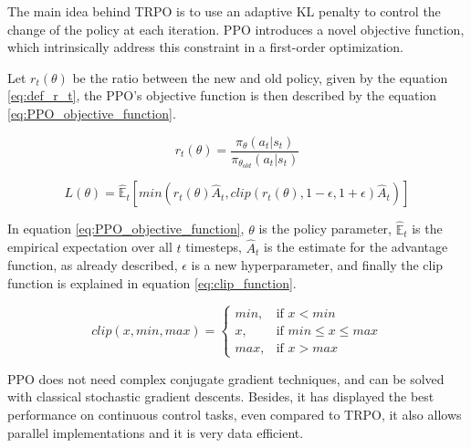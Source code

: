 The main idea behind TRPO is to use an adaptive KL penalty to control the change of the policy at each iteration. PPO introduces a novel objective function, which intrinsically address this constraint in a first-order optimization.

Let $r_t(\theta)$ be the ratio between the new and old policy, given by the equation \ref{eq:def_r_t}, the PPO's objective function is then described by the equation \ref{eq:PPO_objective_function}.

\begin{equation}
r_t(\theta) = \frac{\pi_{\theta}(a_t|s_t)}{\pi_{\theta_{old}}(a_t|s_t)}
\label{eq:def_r_t}
\end{equation}

\begin{equation}
L(\theta) = \mathbb{\hat{E}}_t \left[ min(r_t(\theta)\hat{A}_t, clip(r_t(\theta),1-\epsilon,1+\epsilon)\hat{A}_t) \right]
\label{eq:PPO_objective_function}
\end{equation}

In equation \ref{eq:PPO_objective_function}, $\theta$ is the policy parameter, $\mathbb{\hat{E}}_t$ is the empirical expectation over all $t$ timesteps, $\hat{A}_t$ is the estimate for the advantage function, as already described, $\epsilon$ is a new hyperparameter, and finally the clip function is explained in equation \ref{eq:clip_function}.

\begin{equation}
clip(x,min,max) = \begin{cases}
        min, & \mbox{if } x < min \\
        x, & \mbox{if } min \leq x \leq max \\
        max, & \mbox{if } x > max
        \end{cases}
\label{eq:clip_function}
\end{equation}

PPO does not need complex conjugate gradient techniques, and can be solved with classical stochastic gradient descents. Besides, it has displayed the best performance on continuous control tasks, even compared to TRPO, it also allows parallel implementations and it is very data efficient.



